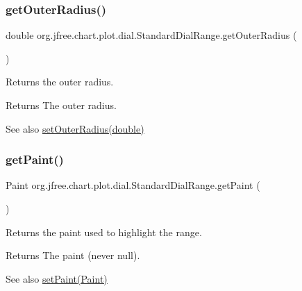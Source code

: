 \subsubsection{\texorpdfstring{get\+Outer\+Radius()}{getOuterRadius()}}
{\footnotesize\ttfamily double org.\+jfree.\+chart.\+plot.\+dial.\+Standard\+Dial\+Range.\+get\+Outer\+Radius (\begin{DoxyParamCaption}{ }\end{DoxyParamCaption})}

Returns the outer radius.

\begin{DoxyReturn}{Returns}
The outer radius.
\end{DoxyReturn}
\begin{DoxySeeAlso}{See also}
\mbox{\hyperlink{classorg_1_1jfree_1_1chart_1_1plot_1_1dial_1_1_standard_dial_range_a7596d8ab0a85553ff4b9f09985e979c8}{set\+Outer\+Radius(double)}} 
\end{DoxySeeAlso}
\mbox{\label{classorg_1_1jfree_1_1chart_1_1plot_1_1dial_1_1_standard_dial_range_a74fc216bebcdfc919fb55d24238d090b}} 
\subsubsection{\texorpdfstring{get\+Paint()}{getPaint()}}
{\footnotesize\ttfamily Paint org.\+jfree.\+chart.\+plot.\+dial.\+Standard\+Dial\+Range.\+get\+Paint (\begin{DoxyParamCaption}{ }\end{DoxyParamCaption})}

Returns the paint used to highlight the range.

\begin{DoxyReturn}{Returns}
The paint (never {\ttfamily null}).
\end{DoxyReturn}
\begin{DoxySeeAlso}{See also}
\mbox{\hyperlink{classorg_1_1jfree_1_1chart_1_1plot_1_1dial_1_1_standard_dial_range_a00c1867bb1933c1aaa11327e2c70e237}{set\+Paint(\+Paint)}} 
\end{DoxySeeAlso}
\mbox{\label{classorg_1_1jfree_1_1chart_1_1plot_1_1dial_1_1_standard_dial_range_a019cb98d6dc8e80e906e682683f2bc6c}} 
